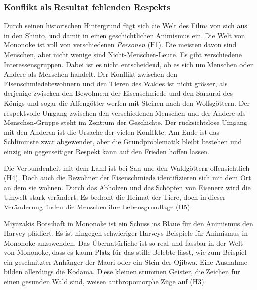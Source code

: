 \subsubsection{Konflikt als Resultat fehlenden Respekts} 
Durch seinen historischen Hintergrund fügt sich die Welt des Films von sich aus in den Shinto, und damit in einen geschichtlichen Animismus ein. Die Welt von Mononoke ist voll von verschiedenen \emph{Personen} (H1). Die meisten davon sind Menschen, aber nicht wenige sind Nicht-Menschen-Leute. Es gibt verschiedene Interessensgruppen. Dabei ist es nicht entscheidend, ob es sich um Menschen oder Andere-als-Menschen handelt. Der Konflikt zwischen den Eisenschmiedebewohnern und den Tieren des Waldes ist nicht grösser, als derjenige zwischen den Bewohnern der Eisenschmiede und den Samurai des Königs und sogar die Affengötter werfen mit Steinen nach den Wolfsgöttern. Der respektvolle Umgang zwischen den verschiedenen Menschen und der Andere-als-Menschen-Gruppe steht im Zentrum der Geschichte. Der rücksichtslose Umgang mit den Anderen ist die Ursache der vielen Konflikte. Am Ende ist das Schlimmste zwar abgewendet, aber die Grundproblematik bleibt bestehen und einzig ein gegenseitiger Respekt kann auf den Frieden hoffen lassen. 
 
Die Verbundenheit mit dem Land ist bei San und den Waldgöttern offensichtlich (H4). Doch auch die Bewohner der Eisenschmiede identifizieren sich mit dem Ort an dem sie wohnen. Durch das Abholzen und das Schöpfen von Eisenerz wird die Umwelt stark verändert. Es bedroht die Heimat der Tiere, doch in dieser Veränderung finden die Menschen ihre Lebensgrundlage (H5).

Miyazakis Botschaft in Mononoke ist ein Schuss ins Blaue für den Animismus den Harvey plädiert. Es ist hingegen schwieriger Harveys Beispiele für Animismus in Mononoke anzuwenden. Das Übernatürliche ist so real und fassbar in der Welt von Mononoke, dass es kaum Platz für das stille Belebte lässt, wie zum Beispiel ein geschnitzter Anhänger der Maori oder ein Stein der Ojibwa. Eine Ausnahme bilden allerdings die Kodama. Diese kleinen stummen Geister, die Zeichen für einen gesunden Wald sind, weisen anthropomorphe Züge auf (H3). 

